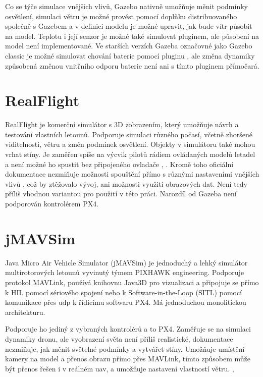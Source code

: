         Co se týče simulace vnějších vlivů, Gazebo nativně umožňuje měnit podmínky osvětlení, simulaci větru je možné provést pomocí doplňku distribuovaného společně s Gazebem a v definici modelu je možné upravit, jak bude vítr působit na model. Teplotu i její senzor je možné také simulovat pluginem, ale působení na model není implementované. Ve starších verzích Gazeba označovné jako Gazebo classic je možné simulovat chování baterie pomocí pluginu \cite{batplugin}, ale změna dynamiky způsobená změnou vnitřního odporu baterie není ani s tímto pluginem přímočará.

    \section{RealFlight} \label{sec:realflight}
        RealFlight je komerční simulátor s 3D zobrazením, který umožňuje návrh a testování vlastních letounů. Podporuje simulaci různého počasí, včetně zhoršené viditelnosti, větru a změn podmínek osvětlení. Objekty v simulátoru také mohou vrhat stíny. Je zaměřen spíše na výcvik pilotů rádiem ovládaných modelů letadel a není možné ho spustit bez připojeného ovladače \cite{ardupilot:realflight}, \cite{realflight}. Kromě toho oficiální dokumentace nezmiňuje možnosti spouštění přímo s různými nastaveními vnějších vlivů \cite{realflight}, což by ztěžovalo vývoj, ani možnosti využití obrazových dat. Není tedy příliš vhodnou variantou pro použití v této práci. Narozdíl od Gazeba není podporován kontrolérem PX4.

    \section{jMAVSim} \label{sec:jmavsim}
        Java Micro Air Vehicle Simulator (jMAVSim) je jednoduchý a lehký simulátor multirotorových letounů vyvinutý týmem PIXHAWK engineering. Podporuje protokol MAVLink, používá knihovnu Java3D pro vizualizaci a připojuje se přímo k HIL pomocí sériového spojení nebo k Software-in-the-Loop (SITL) pomocí komunikace přes \acrfull{udp} k řídicímu softwaru PX4. Má jednoduchou monolitickou architekturu. \cite{Ebeid2018}

        Podporuje ho jediný z vybraných kontrolérů a to PX4. Zaměřuje se na simulaci dynamiky dronu, ale vyobrazení světa není příliš realistické, dokumentace nezmiňuje, jak měnit světelné podmínky a vytvářet stíny. Umožňuje umístění kamery na model a přenos obrazu přímo přes MAVLink, tímto způsobem může být přenos řešen i v reálném \acrshort{uav}, a umožňuje nastavení vlastností větru. \cite{jmavsim}, \cite{px4:jmavsim}

